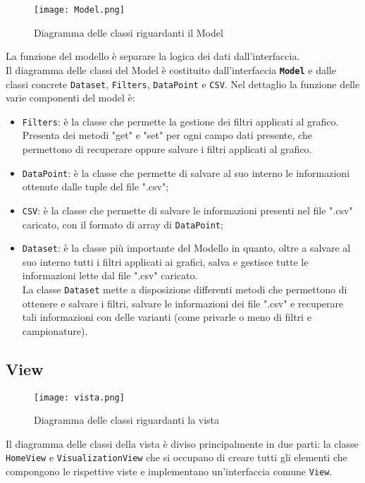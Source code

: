 \begin{figure}[ht]
	\centering
	\texttt{[image: Model.png]}
	\caption{Diagramma delle classi riguardanti il Model}
  \end{figure}
La funzione del modello è separare la logica dei dati dall'interfaccia.\\
Il diagramma delle classi del Model è costituito dall'interfaccia \textbf{\texttt{Model}} e dalle classi concrete \texttt{Dataset}, \texttt{Filters}, \texttt{DataPoint} e \texttt{CSV}.
Nel dettaglio la funzione delle varie componenti del model è:
\begin{itemize}
	\item \texttt{Filters}: è la classe che permette la gestione dei filtri applicati al grafico. Presenta dei metodi "get" e "set" per ogni campo dati presente, che permettono di recuperare oppure salvare i filtri applicati al grafico.
	\item \texttt{DataPoint}: è la classe che permette di salvare al suo interno le informazioni ottenute dalle tuple del file ".csv";
	\item \texttt{CSV}: è la classe che permette di salvare le informazioni presenti nel file ".csv" caricato, con il formato di array di \texttt{DataPoint};
	\item \texttt{Dataset}: è la classe più importante del Modello in quanto, oltre a salvare al suo interno tutti i filtri applicati ai grafici, salva e gestisce tutte le informazioni lette dal file ".csv" caricato.\\ La classe \texttt{Dataset} mette a disposizione differenti metodi che permettono di ottenere e salvare i filtri, salvare le informazioni dei file ".csv" e recuperare tali informazioni con delle varianti (come privarle o meno di filtri e campionature).
\end{itemize}

\subsection{View}
\begin{figure}[H]
    \texttt{[image: vista.png]}
    \caption{Diagramma delle classi riguardanti la vista}
\end{figure}
Il diagramma delle classi della vista è diviso principalmente in due parti: la classe \texttt{HomeView} e \texttt{VisualizationView} che si occupano di creare tutti gli elementi che compongono le rispettive viste e implementano un'interfaccia comune \texttt{View}.


